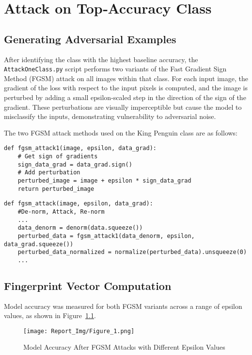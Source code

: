 \documentclass[a4paper,12pt]{report}%
\begin{document}
\chapter{Attack on Top‑Accuracy Class}
\section{Generating Adversarial Examples}
After identifying the class with the highest baseline accuracy, the \texttt{AttackOneClass.py} script performs two variants of the Fast Gradient Sign Method (FGSM) attack on all images within that class. For each input image, the gradient of the loss with respect to the input pixels is computed, and the image is perturbed by adding a small epsilon-scaled step in the direction of the sign of the gradient. These perturbations are visually imperceptible but cause the model to misclassify the inputs, demonstrating vulnerability to adversarial noise.

The two FGSM attack methods used on the King Penguin class are as follows:
\begin{verbatim}
def fgsm_attack1(image, epsilon, data_grad):
    # Get sign of gradients
    sign_data_grad = data_grad.sign()
    # Add perturbation
    perturbed_image = image + epsilon * sign_data_grad
    return perturbed_image
\end{verbatim}
\hfill \break
\begin{verbatim}
def fgsm_attack(image, epsilon, data_grad):
    #De-norm, Attack, Re-norm
    ...
    data_denorm = denorm(data.squeeze())
    perturbed_data = fgsm_attack1(data_denorm, epsilon, data_grad.squeeze())
    perturbed_data_normalized = normalize(perturbed_data).unsqueeze(0)
    ...
\end{verbatim}

\section{Fingerprint Vector Computation}
Model accuracy was measured for both FGSM variants across a range of epsilon values, as shown in Figure~\ref{fig:accuracy_vs_epsilon}.

\begin{figure}[H]
\centering
\texttt{[image: Report\_Img/Figure\_1.png]}
\caption{Model Accuracy After FGSM Attacks with Different Epsilon Values}
\label{fig:accuracy_vs_epsilon}
\end{figure}
\end{document}

